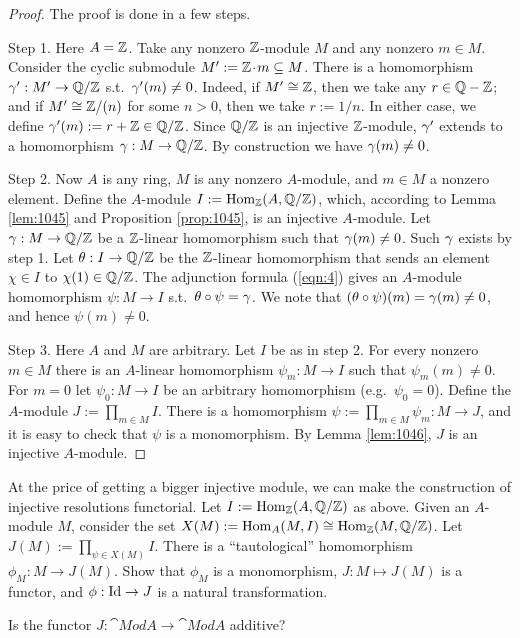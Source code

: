 \begin{proof} The proof is done in a few steps. 

\smallskip \noindent
Step 1. Here $A = \mathbb{Z}$. Take any nonzero $\mathbb{Z}$-module $M$ and any nonzero 
$m \in M$. Consider the cyclic submodule $M' := \mathbb{Z} \mspace{1.5mu}{\cdot}\mspace{1.5mu} m \subseteq M$. 
There is a homomorphism $\gamma' : M' \to \mathbb{Q} / \mathbb{Z}$ s.t.\ 
$\gamma'(m) \neq 0$. Indeed, if $M' \cong \mathbb{Z}$, then we take any 
$r \in \mathbb{Q} - \mathbb{Z}$; and if $M' \cong \mathbb{Z} / (n)$ for some $n > 0$, then we 
take $r := 1 / n$. In either case, we define 
$\gamma'(m) := r + \mathbb{Z} \in \mathbb{Q} / \mathbb{Z}$.
Since $\mathbb{Q} / \mathbb{Z}$ is an injective $\mathbb{Z}$-module, $\gamma'$ extends 
to a homomorphism $\gamma : M \to \mathbb{Q} / \mathbb{Z}$.
By construction we have $\gamma(m) \neq 0$. 

\medskip \noindent 
Step 2. Now $A$ is any ring, $M$ is any nonzero $A$-module, and $m \in M$ a 
nonzero element. Define the $A$-module 
$I := \operatorname{Hom}_{\mathbb{Z}}(A, \mathbb{Q} / \mathbb{Z})$, which, according to Lemma 
\ref{lem:1045} and Proposition \ref{prop:1045}, is an injective $A$-module. 
Let $\gamma : M \to \mathbb{Q} / \mathbb{Z}$ be a $\mathbb{Z}$-linear homomorphism such that 
$\gamma(m) \neq 0$. Such $\gamma$ exists by step 1. Let $\theta : I \to \mathbb{Q} / \mathbb{Z}$ 
be the $\mathbb{Z}$-linear homomorphism that sends an element $\chi \in I$ to 
$\chi(1) \in \mathbb{Q} / \mathbb{Z}$.
The adjunction formula (\ref{eqn:4}) gives an $A$-module homomorphism 
$\psi : M \to I$ s.t.\ $\theta \circ \psi = \gamma$. We note that 
$(\theta \circ \psi)(m) = \gamma(m) \neq 0$, and hence $\psi(m) \neq 0$.  

\medskip \noindent 
Step 3. Here $A$ and $M$ are arbitrary. Let $I$ be as in step 2. For 
every nonzero  $m \in M$ there is an $A$-linear homomorphism $\psi_m : M \to I$ 
such that $\psi_m(m) \neq 0$.  For $m = 0$ let $\psi_0 : M \to I$ be an 
arbitrary homomorphism (e.g.\ $\psi_0 = 0$). 
Define the $A$-module $J := \prod_{m \in M} I$. There is a homomorphism 
$\psi := \prod_{m \in M} \psi_m : M \to J$,
and it is easy to check that $\psi$ 
is a monomorphism. By Lemma \ref{lem:1046}, $J$ is an injective $A$-module. 
\end{proof}

\begin{exer} \label{exer:1040}
At the price of getting a bigger injective module, we can make the 
construction of injective resolutions functorial. Let
$I := \operatorname{Hom}_{\mathbb{Z}}(A, \mathbb{Q} / \mathbb{Z})$ as above. Given an $A$-module $M$, 
consider the set 
$X(M) := \operatorname{Hom}_A(M, I) \cong \operatorname{Hom}_{\mathbb{Z}}(M, \mathbb{Q} / \mathbb{Z})$.
Let 
$J(M) := \prod_{\psi \in X(M)} I$. There is a ``tautological'' homomorphism 
$\phi_M : M \to J(M)$. Show that $\phi_M$ is a monomorphism, 
$J : M \mapsto J(M)$ is a functor, and $\phi : \operatorname{Id} \to J$ is a natural 
transformation. 

Is the functor $J : \cat{Mod} A \to \cat{Mod} A$ additive?
\end{exer}

